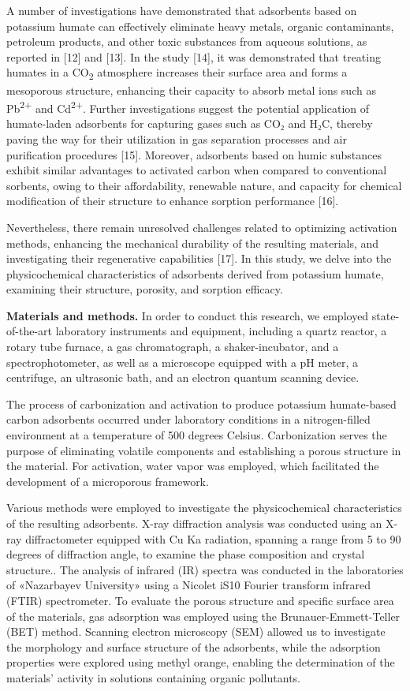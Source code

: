A number of investigations have demonstrated that adsorbents based on
potassium humate can effectively eliminate heavy metals, organic
contaminants, petroleum products, and other toxic substances from
aqueous solutions, as reported in {[}12{]} and {[}13{]}. In the study
{[}14{]}, it was demonstrated that treating humates in a
CO\textsubscript{2} atmosphere increases their surface area and forms a
mesoporous structure, enhancing their capacity to absorb metal ions such
as Pb\textsuperscript{2+} and Cd\textsuperscript{2+}. Further
investigations suggest the potential application of humate-laden
adsorbents for capturing gases such as CO₂ and H₂C, thereby paving the
way for their utilization in gas separation processes and air
purification procedures {[}15{]}. Moreover, adsorbents based on humic
substances exhibit similar advantages to activated carbon when compared
to conventional sorbents, owing to their affordability, renewable
nature, and capacity for chemical modification of their structure to
enhance sorption performance {[}16{]}.

Nevertheless, there remain unresolved challenges related to optimizing
activation methods, enhancing the mechanical durability of the resulting
materials, and investigating their regenerative capabilities {[}17{]}.
In this study, we delve into the physicochemical characteristics of
adsorbents derived from potassium humate, examining their structure,
porosity, and sorption efficacy.

{\bfseries Materials and methods.} In order to conduct this research, we
employed state-of-the-art laboratory instruments and equipment,
including a quartz reactor, a rotary tube furnace, a gas chromatograph,
a shaker-incubator, and a spectrophotometer, as well as a microscope
equipped with a pH meter, a centrifuge, an ultrasonic bath, and an
electron quantum scanning device.

The process of carbonization and activation to produce potassium
humate-based carbon adsorbents occurred under laboratory conditions in a
nitrogen-filled environment at a temperature of 500 degrees Celsius.
Carbonization serves the purpose of eliminating volatile components and
establishing a porous structure in the material. For activation, water
vapor was employed, which facilitated the development of a microporous
framework.

Various methods were employed to investigate the physicochemical
characteristics of the resulting adsorbents. X-ray diffraction analysis
was conducted using an X-ray diffractometer equipped with Cu Ka
radiation, spanning a range from 5 to 90 degrees of diffraction angle,
to examine the phase composition and crystal structure.. The analysis of
infrared (IR) spectra was conducted in the laboratories of «Nazarbayev
University» using a Nicolet iS10 Fourier transform infrared (FTIR)
spectrometer. To evaluate the porous structure and specific surface area
of the materials, gas adsorption was employed using the
Brunauer-Emmett-Teller (BET) method. Scanning electron microscopy (SEM)
allowed us to investigate the morphology and surface structure of the
adsorbents, while the adsorption properties were explored using methyl
orange, enabling the determination of the materials'{}
activity in solutions containing organic pollutants.

